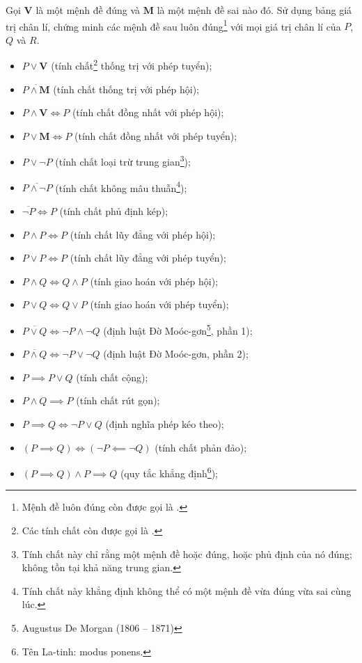  Gọi $\mathbf{V}$ là một mệnh đề đúng và $\mathbf{M}$ là một mệnh đề sai nào đó. Sử dụng bảng giá trị chân lí, chứng minh các mệnh đề sau luôn đúng\footnote{Mệnh đề luôn đúng còn được gọi là .} với mọi giá trị chân lí của $P$, $Q$ và $R$.
\begin{itemize}
   \item $P \lor \mathbf{V}$ (tính chất\footnote{Các tính chất còn được gọi là .} thống trị với phép tuyển);
   \item $\overline{P \land \mathbf{M}}$ (tính chất thống trị với phép hội);
   \item $P \land \mathbf{V} \iff P$ (tính chất đồng nhất với phép hội);
   \item $P \lor \mathbf{M} \iff P$ (tính chất đồng nhất với phép tuyển);
   \item $P \lor \neg P$ (tính chất loại trừ trung gian\footnote{Tính chất này chỉ rằng một mệnh đề hoặc đúng, hoặc phủ định của nó đúng; không tồn tại khả năng trung gian.});
   \item $\overline{P \land \neg P}$ (tính chất không mâu thuẫn\footnote{Tính chất này khẳng định không thể có một mệnh đề vừa đúng vừa sai cùng lúc.});
   \item $\overline{\neg P} \iff P$ (tính chất phủ định kép);
   \item $P \land P \iff P$ (tính chất lũy đẳng với phép hội);
   \item $P \lor P \iff P$ (tính chất lũy đẳng với phép tuyển);
   \item $P \land Q \iff Q \land P$ (tính giao hoán với phép hội);
   \item $P \lor Q \iff Q \lor P$ (tính giao hoán với phép tuyển);
   \item $\overline{P\lor Q} \iff \neg P \land \neg Q$ (định luật Đờ Moóc-gơn\footnote{Augustus De Morgan (1806 -- 1871)}, phần 1);
   \item $\overline{P\land Q} \iff \neg P \lor \neg Q$ (định luật Đờ Moóc-gơn, phần 2);
   \item $P \implies P \lor Q$ (tính chất cộng);
   \item $P \land Q \implies P$ (tính chất rút gọn);
   \item $P \implies Q \iff \neg P \lor Q$ (định nghĩa phép kéo theo);
   \item $\left(P \implies Q\right) \iff \left(\neg P \impliedby \neg Q\right)$ (tính chất phản đảo);
   \item $\left(P \implies Q\right) \land P \implies Q$ (quy tắc khẳng định\footnote{Tên La-tinh: modus ponens.});

\end{itemize}
